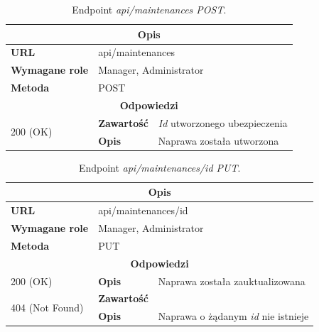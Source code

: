 \documentclass[eng,printmode,openany]{mgr}
\begin{document}
\begin{table}[H]
	\caption{Endpoint \textit{api/maintenances POST}.}
	\begin{tabularx}{\textwidth}{|l|l|X|}
		\hline
		\multicolumn{3}{|c|}{\textbf{\textbf{Opis}}}
		\\ \hline
		\textbf{URL}                       & \multicolumn{2}{l|}{api/maintenances}
		\\ \hline
		\textbf{Wymagane role}             & \multicolumn{2}{l|}{Manager, Administrator}
		\\ \hline
		\textbf{Metoda}                    & \multicolumn{2}{l|}{POST}
		\\ \hline
		\multicolumn{3}{|c|}{\textbf{Odpowiedzi}}
		\\ \hline
		\multirow{2}{*}{200 (OK)} 		& \textbf{Zawartość}     & \textit{Id} utworzonego ubezpieczenia
		\\ \cline{2-3}                  & \textbf{Opis}         	& Naprawa została utworzona
		\\ \hline
	\end{tabularx}
\end{table}

\begin{table}[H]
	\caption{Endpoint \textit{api/maintenances/id PUT}.}
	\begin{tabularx}{\textwidth}{|l|l|X|}
		\hline
		\multicolumn{3}{|c|}{\textbf{\textbf{Opis}}}
		\\ \hline
		\textbf{URL}                       & \multicolumn{2}{l|}{api/maintenances/id}
		\\ \hline
		\textbf{Wymagane role}             & \multicolumn{2}{l|}{Manager, Administrator}
		\\ \hline
		\textbf{Metoda}                    & \multicolumn{2}{l|}{PUT}
		\\ \hline
		\multicolumn{3}{|c|}{\textbf{Odpowiedzi}}
		\\ \hline
		200 (OK) 		                        & \textbf{Opis}      	& Naprawa została zauktualizowana
		\\ \hline
		\multirow{2}{*}{404 (Not Found)} 	    & \textbf{Zawartość}     & 
		\\ \cline{2-3}                          & \textbf{Opis}          & Naprawa o żądanym \textit{id} nie istnieje
		\\ \hline
	\end{tabularx}
\end{table}
\end{document}
